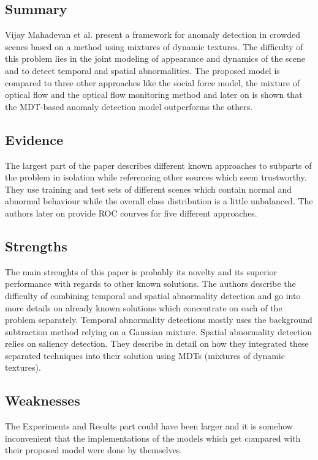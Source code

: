 \documentclass[a4paper]{article}
\begin{document}
\subsection{Summary}

Vijay Mahadevan et al. present a framework for anomaly detection in crowded scenes based on a method using mixtures of dynamic textures. The difficulty of this problem lies in the joint modeling of appearance and dynamics of the scene and to detect temporal and spatial abnormalities. The proposed model is compared to three other approaches like the social force model, the mixture of optical flow and the optical flow monitoring method and later on is shown that the MDT-based anomaly detection model outperforms the others.

\subsection{Evidence}

The largest part of the paper describes different known approaches to subparts of the problem in isolation while referencing other sources which seem trustworthy. They use training and test sets of different scenes which contain normal and abnormal behaviour while the overall class distribution is a little unbalanced. The authors later on provide ROC courves for five different approaches. 

\subsection{Strengths}

The main strenghts of this paper is probably its novelty and its superior performance with regards to other known solutions. The authors describe the difficulty of combining temporal and spatial abnormality detection and go into more details on already known solutions which concentrate on each of the problem separately. Temporal abnormality detections mostly uses the background subtraction method relying on a Gaussian mixture. Spatial abnormality detection relies on saliency detection. They describe in detail on how they integrated these separated techniques into their solution using MDTs (mixtures of dynamic textures).


\subsection{Weaknesses}

The Experiments and Results part could have been larger and it is somehow inconvenient that the implementations of the models which get compared with their proposed model were done by themselves.
\end{document}

